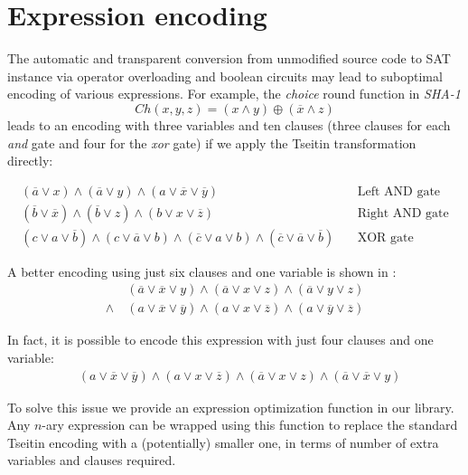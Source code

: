 \section{Expression encoding}
\label{sec:expression-encoding}
The automatic and transparent conversion from unmodified source code to SAT instance via operator overloading and boolean circuits may lead to suboptimal encoding of various expressions.
For example, the \emph{choice} round function in \emph{SHA-1}
\[
Ch(x, y, z) = (x \land y) \oplus (\overline{x} \land z)
\]
leads to an encoding with three variables and ten clauses (three clauses for each \emph{and} gate and four for the \emph{xor} gate) if we apply the Tseitin transformation directly:

\begin{align*}
(\overline{a} \lor x) \land (\overline{a} \lor y) \land (a \lor \overline{x} \lor \overline{y}) &~& \text{Left AND gate}\\
(\overline{b} \lor \overline{x}) \land (\overline{b} \lor z) \land (b \lor x \lor \overline{z})&~& \text{Right AND gate} \\
(c \lor a \lor \overline{b}) \land (c \lor \overline{a} \lor b) \land (\overline{c} \lor a \lor b) \land (\overline{c} \lor \overline{a} \lor \overline{b}) &~& \text{XOR gate}
\end{align*}

A better encoding using just six clauses and one variable is shown in \cite{nossum2012sat}:
\begin{align*}
&(\overline{a} \lor \overline{x} \lor y) \land (\overline{a} \lor x \lor z) \land (\overline{a} \lor y \lor z) \\
\land~ &(a \lor \overline{x} \lor \overline{y}) \land (a \lor x \lor \overline{z}) \land (a \lor \overline{y} \lor \overline{z})
\end{align*}

In fact, it is possible to encode this expression with just four clauses and one variable:
\begin{align*}
&(a \lor \overline{x} \lor \overline{y}) \land (a \lor x \lor \overline{z}) \land (\overline{a} \lor x \lor z) \land (\overline{a} \lor \overline{x} \lor y)
\end{align*}


To solve this issue we provide an expression optimization function in our library.
Any $n$-ary expression can be wrapped using this function to replace the standard Tseitin encoding with a (potentially) smaller one, in terms of number of extra variables and clauses required.

